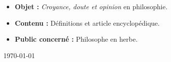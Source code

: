 \begin{titlepage}
\vfill
{\sf
\begin{itemize}[leftmargin=1cm, label=, itemsep=1pt]
\item {\bf Objet : } {\it Croyance, doute et opinion} en philosophie.
\item {\bf Contenu : } Définitions et article encyclopédique.
\item {\bf Public concerné : } Philosophe en herbe.
\end{itemize}
}

\vfill

{\large \today}

\end{titlepage}
